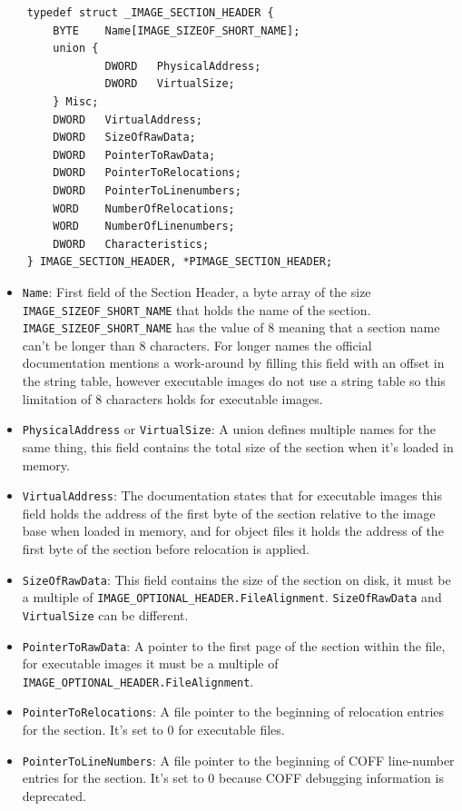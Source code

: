 \begin{verbatim}
    typedef struct _IMAGE_SECTION_HEADER {
        BYTE    Name[IMAGE_SIZEOF_SHORT_NAME];
        union {
                DWORD   PhysicalAddress;
                DWORD   VirtualSize;
        } Misc;
        DWORD   VirtualAddress;
        DWORD   SizeOfRawData;
        DWORD   PointerToRawData;
        DWORD   PointerToRelocations;
        DWORD   PointerToLinenumbers;
        WORD    NumberOfRelocations;
        WORD    NumberOfLinenumbers;
        DWORD   Characteristics;
    } IMAGE_SECTION_HEADER, *PIMAGE_SECTION_HEADER;    
\end{verbatim}
\begin{itemize}

        \item \verb+Name+: First field of the Section Header, a byte array of the size \verb+IMAGE_SIZEOF_SHORT_NAME+ that holds the name of the section. \verb+IMAGE_SIZEOF_SHORT_NAME+ has the value of 8 meaning that a section name can’t be longer than 8 characters. For longer names the official documentation mentions a work-around by filling this field with an offset in the string table, however executable images do not use a string table so this limitation of 8 characters holds for executable images.
        \item \verb+PhysicalAddress+ or \verb+VirtualSize+: A union defines multiple names for the same thing, this field contains the total size of the section when it’s loaded in memory.
        \item \verb+VirtualAddress+: The documentation states that for executable images this field holds the address of the first byte of the section relative to the image base when loaded in memory, and for object files it holds the address of the first byte of the section before relocation is applied.
        \item \verb+SizeOfRawData+: This field contains the size of the section on disk, it must be a multiple of \verb+IMAGE_OPTIONAL_HEADER.FileAlignment+. \verb+SizeOfRawData+ and \verb+VirtualSize+ can be different.
        \item \verb+PointerToRawData+: A pointer to the first page of the section within the file, for executable images it must be a multiple of \verb+IMAGE_OPTIONAL_HEADER.FileAlignment+.
        \item \verb+PointerToRelocations+: A file pointer to the beginning of relocation entries for the section. It’s set to 0 for executable files.
        \item \verb+PointerToLineNumbers+: A file pointer to the beginning of COFF line-number entries for the section. It’s set to 0 because COFF debugging information is deprecated.

\end{itemize}
